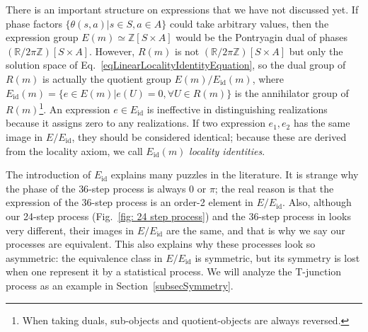 \documentclass[reprint, amsmath, amssymb, showpacs, floatfix, longbibliography, aps, twocolumn, superscriptaddress, nofootinbib]{revtex4-2}
\newcommand{\ZZ}{{\mathbb Z}}
\newcommand{\RR}{{\mathbb R}}
\newcommand{\id}{{\operatorname{id}}}
\theoremstyle{definition}
\begin{document}
There is an important structure on expressions that we have not discussed yet. If phase factors $\{\theta(s,a)|s\in S,a\in A\}$ could take arbitrary values, then the expression group $E(m)\simeq \ZZ[S\times A]$ would be the Pontryagin dual of phases $(\RR/2\pi\ZZ)[S\times A]$. However, $R(m)$ is not $(\RR/2\pi\ZZ)[S\times A]$ but only the solution space of Eq.~\eqref{eqLinearLocalityIdentityEquation}, so the dual group of $R(m)$ is actually the quotient group $E(m)/E_{\operatorname{id}}(m)$, where $E_{\operatorname{id}}(m)=\{e\in E(m)|e(U)=0,\forall U\in R(m)\}$ is the annihilator group of $R(m)$\footnote{ When taking duals, sub-objects and quotient-objects are always reversed.}. An expression $e\in E_{\operatorname{id}}$ is ineffective in distinguishing realizations because it assigns zero to any realizations.
If two expression $e_1,e_2$ has the same image in $E/E_\id$, they should be considered identical; because these are derived from the locality axiom, we call $E_{\operatorname{id}}(m)$  \textit{locality identities}. 


The introduction of $E_\id$ explains many puzzles in the literature. It is strange why the phase of the $36$-step process is always $0$ or $\pi$; the real reason is that the expression of the $36$-step process is an order-2 element in $E/E_\id$. Also, although our 24-step process (Fig.~\ref{fig: 24 step process}) and the 36-step process in \cite{FHH21} looks very different, their images in $E/E_\id$ are the same, and that is why we say our processes are equivalent. This also explains why these processes look so asymmetric: the equivalence class in $E/E_\id$ is symmetric, but its symmetry is lost when one represent it by a statistical process. We will analyze the T-junction process as an example in Section~\ref{subsecSymmetry}.
\end{document}
